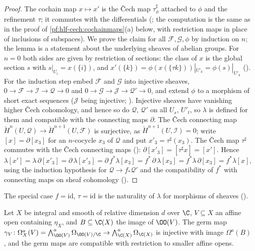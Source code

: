 \begin{proof}
The cochain map $x\mapsto x'$ is the \v{C}ech map $\tau^\sharp_\phi$ attached to $\phi$ and the refinement $\tau$; it commutes with the
differentials (; the computation is the same as in the proof of
\cref{pf:hlf-cech:cochainmaps}(a) below, with restriction maps in place of inclusions of subspaces). We prove the claim for all $\mathcal F,\mathcal G,\phi$ by induction on $n$; the lemma is a statement about
the underlying sheaves of abelian groups. For $n=0$ both sides are given by restriction of sections: the class of $x$ is the global section $s$
with $s|_{U_i}=x(\{i\})$, and $x'(\{k\})=\phi(x(\{\tau k\}))|_{U'_k}=\phi(s)|_{U'_k}$ ().
For the induction step embed $\mathcal F$ and $\mathcal G$ into injective sheaves, $0\to\mathcal F\to\mathcal I\to\mathcal Q\to0$ and
$0\to\mathcal G\to\mathcal J\to\mathcal Q'\to0$, and extend $\phi$ to a morphism of short exact sequences ($\mathcal J$ being injective;
). Injective sheaves have vanishing higher \v{C}ech cohomology, and hence so do
$\mathcal Q$, $\mathcal Q'$ on all $U_s$, $U'_t$, so $\lambda$ is defined for them and compatible with the connecting maps $\partial$. The
\v{C}ech connecting map $\check H^n(U,\mathcal Q)\to\check H^{n+1}(U,\mathcal F)$ is surjective, as $\check H^{n+1}(U,\mathcal I)=0$; write
$[x]=\partial[x_3]$ for an $n$-cocycle $x_3$ of $\mathcal Q$ and put $x'_3=\tau^\sharp(x_3)$. The \v{C}ech map $\tau^\sharp$ commutes with the \v{C}ech
connecting maps (): $\partial[x'_3]=[\tau^\sharp x]=[x']$. Hence
\[
  \lambda[x']=\lambda\,\partial[x'_3]=\partial\,\lambda[x'_3]=\partial\,f^*\lambda[x_3]=f^*\,\partial\,\lambda[x_3]=f^*\lambda\,\partial[x_3]=f^*\lambda[x],
\]
using the induction hypothesis for $\mathcal Q\to f_*\mathcal Q'$ and the compatibility of $f^*$ with connecting maps on sheaf cohomology
().
\end{proof}

The special case $f=\mathrm{id}$, $\tau=\mathrm{id}$ is the naturality of $\lambda$ for morphisms of sheaves
().

\begin{lemma}\label{pf:hlf-cech:germforms}
Let $X$ be integral and smooth of relative dimension $d$ over $\C$, $V\subseteq X$ an affine open containing $\eta_X$, and $B\subseteq\C(X)$ the image of
$\OO(V)$. The germ map $\gamma_V\colon\Omega^a_X(V)=\bigwedge^a_{\OO(V)}\Omega_{\OO(V)/\C}\to\bigwedge^a_{\C(X)}\Omega_{\C(X)}$ is injective with image
$\Omega^a(B)$, and the germ maps are compatible with restriction to smaller affine opens.
\end{lemma}

